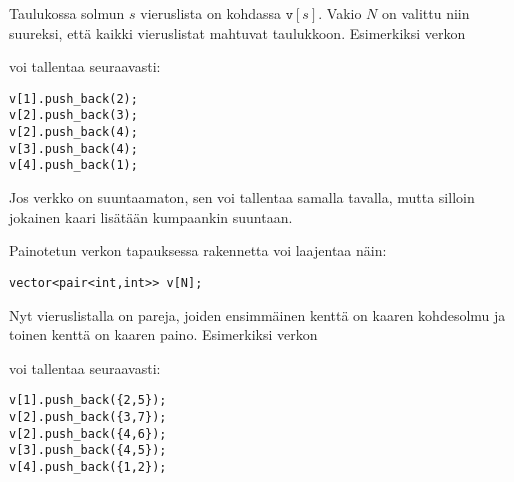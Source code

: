 Taulukossa solmun $s$ vieruslista on kohdassa $\texttt{v}[s]$.
Vakio $N$ on valittu niin suureksi,
että kaikki vieruslistat mahtuvat taulukkoon.
Esimerkiksi verkon

\begin{center}
\end{center}
voi tallentaa seuraavasti:
\begin{lstlisting}
v[1].push_back(2);
v[2].push_back(3);
v[2].push_back(4);
v[3].push_back(4);
v[4].push_back(1);
\end{lstlisting}

Jos verkko on suuntaamaton, sen voi tallentaa samalla tavalla,
mutta silloin jokainen kaari lisätään kumpaankin suuntaan.

Painotetun verkon tapauksessa rakennetta voi laajentaa näin:

\begin{lstlisting}
vector<pair<int,int>> v[N];
\end{lstlisting}

Nyt vieruslistalla on pareja, joiden ensimmäinen kenttä on
kaaren kohdesolmu ja toinen kenttä on kaaren paino.
Esimerkiksi verkon

\begin{center}
\end{center}
voi tallentaa seuraavasti:
\begin{lstlisting}
v[1].push_back({2,5});
v[2].push_back({3,7});
v[2].push_back({4,6});
v[3].push_back({4,5});
v[4].push_back({1,2});
\end{lstlisting}

